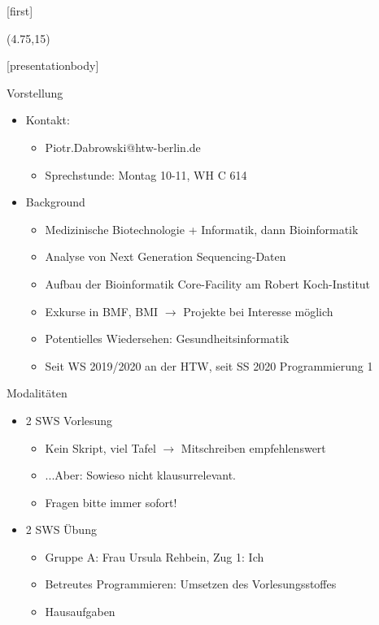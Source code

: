 \documentclass[aspectratio=169,t]{beamer}
\subtitle{1: Allgemeines}
\begin{document}
[first]

\begin{frame}[noframenumbering]
    \titlepage
    \begin{textblock}{10}(4.75,15)
        \cite{logo}
    \end{textblock}
\end{frame}

[presentationbody] 

\begin{frame}{Vorstellung}
	\begin{itemize}
		\item Kontakt:
		\begin{itemize}
			\item Piotr.Dabrowski@htw-berlin.de
			\item Sprechstunde: Montag 10-11, WH C 614
		\end{itemize}
		\item Background
		\begin{itemize}
			\item Medizinische Biotechnologie + Informatik, dann Bioinformatik
			\item Analyse von Next Generation Sequencing-Daten
			\item Aufbau der Bioinformatik Core-Facility am Robert Koch-Institut
			\item Exkurse in BMF, BMI $\rightarrow$ Projekte bei Interesse möglich
			\item Potentielles Wiedersehen: Gesundheitsinformatik
			\item Seit WS 2019/2020 an der HTW, seit SS 2020 Programmierung 1
		\end{itemize}
	\end{itemize}
\end{frame}

\begin{frame}{Modalitäten}
	\begin{itemize}
		\item 2 SWS Vorlesung
		\begin{itemize}
			\item Kein Skript, viel Tafel $\rightarrow$ Mitschreiben empfehlenswert
			\item ...Aber: Sowieso nicht klausurrelevant.
			\item Fragen bitte immer sofort!
		\end{itemize}
		\item 2 SWS Übung
		\begin{itemize}
			\item Gruppe A: Frau Ursula Rehbein, Zug 1: Ich
			\item Betreutes Programmieren: Umsetzen des Vorlesungsstoffes
			\item Hausaufgaben
		\end{itemize}
	\end{itemize}
\end{frame}
\end{document}
